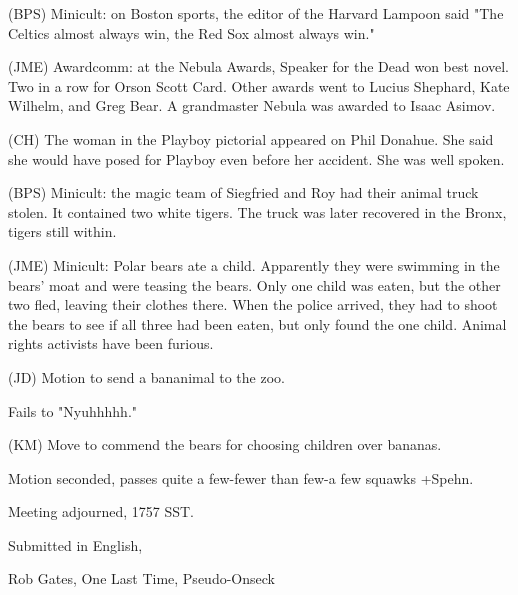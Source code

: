 \documentclass[12pt]{article}
\begin{document}
(BPS) Minicult: on Boston sports, the editor of the Harvard Lampoon said "The Celtics almost always win, the Red Sox almost always win."

(JME) Awardcomm: at the Nebula Awards, Speaker for the Dead won best novel. Two in a row for Orson Scott Card. Other awards went to Lucius Shephard, Kate Wilhelm, and Greg Bear. A grandmaster Nebula was awarded to Isaac Asimov.

(CH) The woman in the Playboy pictorial appeared on Phil Donahue. She said she would have posed for Playboy even before her accident. She was well spoken.

(BPS) Minicult: the magic team of Siegfried and Roy had their animal truck stolen. It contained two white tigers. The truck was later recovered in the Bronx, tigers still within.

(JME) Minicult: Polar bears ate a child. Apparently they were swimming in the bears' moat and were teasing the bears. Only one child was eaten, but the other two fled, leaving their clothes there. When the police arrived, they had to shoot the bears to see if all three had been eaten, but only found the one child. Animal rights activists have been furious.

(JD) Motion to send a bananimal to the zoo.

Fails to "Nyuhhhhh."

(KM) Move to commend the bears for choosing children over bananas.

Motion seconded, passes quite a few-fewer than few-a few squawks +Spehn.

\vspace{12pt}

\noindent
Meeting adjourned, 1757 SST.

\vspace{18pt}

\centerline{Submitted in English,}
\centerline{Rob Gates, One Last Time, Pseudo-Onseck}
\end{document}
